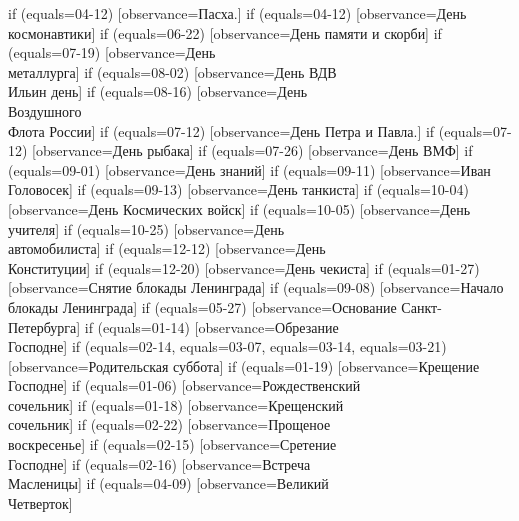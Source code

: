 {%
  if (equals=04-12) [observance=Пасха.]
  if (equals=04-12) [observance=День\\ космонавтики]
  if (equals=06-22) [observance=День памяти и скорби]
  if (equals=07-19) [observance=День\\ металлурга]
  if (equals=08-02) [observance=День ВДВ\\ Ильин день]
  if (equals=08-16) [observance=День\\ Воздушного\\ Флота России]
  if (equals=07-12) [observance=День Петра и Павла.]
  if (equals=07-12) [observance=День рыбака]
  if (equals=07-26) [observance=День ВМФ]
  if (equals=09-01) [observance=День знаний]
  if (equals=09-11) [observance=Иван Головосек]
  if (equals=09-13) [observance=День танкиста]
  if (equals=10-04) [observance=День Космических войск]
  if (equals=10-05) [observance=День учителя]
  if (equals=10-25) [observance=День\\ автомобилиста]
  if (equals=12-12) [observance=День\\ Конституции]
  if (equals=12-20) [observance=День чекиста]
  if (equals=01-27) [observance=Снятие блокады Ленинграда]
  if (equals=09-08) [observance=Начало блокады Ленинграда]
  if (equals=05-27) [observance=Основание Санкт-Петербурга]
  if (equals=01-14) [observance=Обрезание\\ Господне]
  if (equals=02-14,
  	equals=03-07,
	equals=03-14,
	equals=03-21) [observance=Родительская суббота]
  if (equals=01-19) [observance=Крещение\\ Господне]
  if (equals=01-06) [observance=Рождественский\\ сочельник]
  if (equals=01-18) [observance=Крещенский\\ сочельник]
  if (equals=02-22) [observance=Прощеное\\ воскресенье]
  if (equals=02-15) [observance=Сретение\\ Господне]
  if (equals=02-16) [observance=Встреча\\ Масленицы]
  if (equals=04-09) [observance=Великий\\ Четверток]
}
